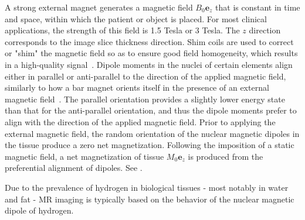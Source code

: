A strong external magnet generates a magnetic field $B_0\bm{e}_z$ that is constant in time and space, within which the patient or object is placed. For most clinical applications, the strength of this field is 1.5 Tesla or 3 Tesla. The $z$ direction corresponds to the image slice thickness direction. Shim coils are used to correct or "shim" the magnetic field so as to ensure good field homogeneity, which results in a high-quality signal~\cite{jacobs_2007}. Dipole moments in the nuclei of certain elements align either in parallel or anti-parallel to the direction of the applied magnetic field, similarly to how a bar magnet orients itself in the presence of an external magnetic field~\cite{hendrick_1994}. The parallel orientation provides a slightly lower energy state than that for the anti-parallel orientation, and thus the dipole moments prefer to align with the direction of the applied magnetic field. Prior to applying the external magnetic field, the random orientation of the nuclear magnetic dipoles in the tissue produce a zero net magnetization. Following the imposition of a static magnetic field, a net magnetization of tissue $M_0\bm{e}_z$ is produced from the preferential alignment of dipoles. See .

Due to the prevalence of hydrogen in biological tissues - most notably in water and fat - MR imaging is typically based on the behavior of the nuclear magnetic dipole of hydrogen.

